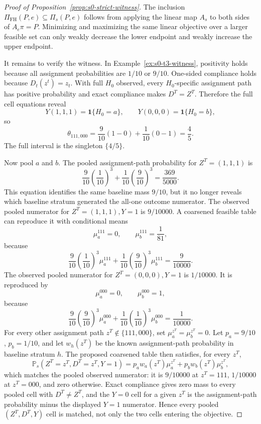 \documentclass[11pt]{article}
\renewcommand{\Pr}{\mathbb{P}}
\newcommand{\one}{\mathbf{1}}
\theoremstyle{definition}
\theoremstyle{plain}
\theoremstyle{remark}
\begin{document}
\begin{proof}[Proof of Proposition~\ref{prop:s0-strict-witness}]
The inclusion \(\Pi_{\mathrm{FH}}(P,e)\subseteq\Pi_s(P,e)\) follows from applying the linear map \(A_s\) to both sides of \(A_e\pi=P\).  Minimizing and maximizing the same linear objective over a larger feasible set can only weakly decrease the lower endpoint and weakly increase the upper endpoint.

It remains to verify the witness.  In Example~\ref{ex:s0-t3-witness}, positivity holds because all assignment probabilities are \(1/10\) or \(9/10\).  One-sided compliance holds because \(D_t(z^t)=z_t\).  With full \(H_0\) observed, every \(H_0\)-specific assignment path has positive probability and exact compliance makes \(D^T=Z^T\).  Therefore the full cell equations reveal
\[
Y(1,1,1)=\one\{H_0=a\},\qquad
Y(0,0,0)=\one\{H_0=b\},
\]
so
\[
\theta_{111,000}
=\frac{9}{10}(1-0)+\frac{1}{10}(0-1)=\frac45.
\]
The full interval is the singleton \(\{4/5\}\).

Now pool \(a\) and \(b\).  The pooled assignment-path probability for \(Z^T=(1,1,1)\) is
\[
\frac{9}{10}\left(\frac1{10}\right)^3+
\frac{1}{10}\left(\frac9{10}\right)^3
=\frac{369}{5000}.
\]
This equation identifies the same baseline mass \(9/10\), but it no longer reveals which baseline stratum generated the all-one outcome numerator.  The observed pooled numerator for \(Z^T=(1,1,1),Y=1\) is \(9/10000\).  A coarsened feasible table can reproduce it with conditional means
\[
\mu_a^{111}=0,\qquad \mu_b^{111}=\frac1{81},
\]
because
\[
\frac{9}{10}\left(\frac1{10}\right)^3\mu_a^{111}
+\frac{1}{10}\left(\frac9{10}\right)^3\mu_b^{111}
=\frac{9}{10000}.
\]
The observed pooled numerator for \(Z^T=(0,0,0),Y=1\) is \(1/10000\).  It is reproduced by
\[
\mu_a^{000}=0,\qquad \mu_b^{000}=1,
\]
because
\[
\frac{9}{10}\left(\frac9{10}\right)^3\mu_a^{000}
+\frac{1}{10}\left(\frac1{10}\right)^3\mu_b^{000}
=\frac{1}{10000}.
\]
For every other assignment path \(z^T\notin\{111,000\}\), set
\(\mu_a^{z^T}=\mu_b^{z^T}=0\).  Let \(p_a=9/10\), \(p_b=1/10\), and let
\(w_h(z^T)\) be the known assignment-path probability in baseline stratum
\(h\).  The proposed coarsened table then satisfies, for every \(z^T\),
\[
\Pr_s(Z^T=z^T,D^T=z^T,Y=1)
=p_aw_a(z^T)\mu_a^{z^T}+p_bw_b(z^T)\mu_b^{z^T},
\]
which matches the pooled observed numerator: it is \(9/10000\) at
\(z^T=111\), \(1/10000\) at \(z^T=000\), and zero otherwise.  Exact
compliance gives zero mass to every pooled cell with \(D^T\ne Z^T\), and
the \(Y=0\) cell for a given \(z^T\) is the assignment-path probability
minus the displayed \(Y=1\) numerator.  Hence every pooled
\((Z^T,D^T,Y)\) cell is matched, not only the two cells entering the
objective.


\end{proof}
\end{document}
